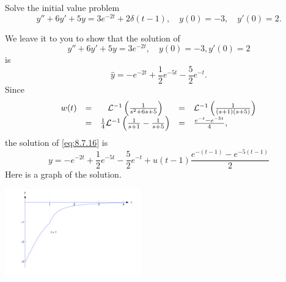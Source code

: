 \documentclass{ximera}
\begin{document}
\begin{example}\label{example:8.7.2}
Solve the initial value problem
\begin{equation} \label{eq:8.7.16}
y''+6y'+5y=3e^{-2t}+2\delta(t-1),\quad y(0)=-3,\quad y'(0)=2.
\end{equation}
\begin{explanation}
We leave it to you to show that
the solution of
$$
y''+6y'+5y=3e^{-2t}, \quad    y(0)=-3, y'(0)=2
$$
is
$$
\hat y=-e^{-2t}+\frac{1}{2}e^{-5t}-\frac{5}{2}e^{-t}.
$$
Since
$$
\begin{array}{ccccl}
w(t)&=&{\cal L}^{-1}\left(\frac{1}{s^2+6s+5}\right)&=&
{\cal L}^{-1}\left(\frac{1}{(s+1)(s+5)}\right)\\
&=&\frac{1}{4}{\cal L}^{-1}\left(\frac{1}{s+1}-\frac{1}{s+5}\right)
&=&\frac{e^{-t}-e^{-5t}}{4},
\end{array}
$$
the solution of  \eqref{eq:8.7.16} is
\begin{equation} \label{eq:8.7.17}
y=-e^{-2t}+\frac{1}{2}e^{-5t}-\frac{5}{2}e^{-t}
+u(t-1)\frac{e^{-(t-1)}-e^{-5(t-1)}}{2}
\end{equation}
Here is a graph of the solution.
\begin{image}
 \includegraphics[height=1.5in]{fig080704.jpg}
\end{image}
\end{explanation}
\end{example}

\end{document}
